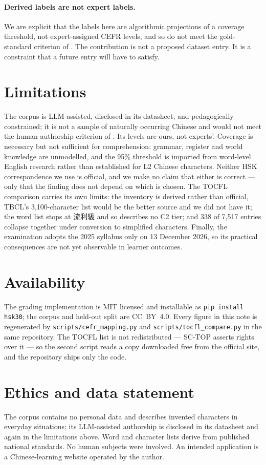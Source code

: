 \documentclass[11pt]{article}
\begin{document}
\paragraph{Derived labels are not expert labels.} We are explicit that the
labels here are algorithmic projections of a coverage threshold, not
expert-assigned CEFR levels, and so do not meet the gold-standard criterion of
\citet{imperial2025universalcefr}. The contribution is not a proposed dataset
entry. It is a constraint that a future entry will have to satisfy.

\section{Limitations}

The corpus is LLM-assisted, disclosed in its datasheet, and pedagogically
constrained; it is not a sample of naturally occurring Chinese and would not
meet the human-authorship criterion of \citet{imperial2025universalcefr}. Its
levels are ours, not experts'. Coverage is necessary but not sufficient for
comprehension: grammar, register and world knowledge are unmodelled, and the
95\% threshold is imported from word-level English research rather than
established for L2 Chinese characters. Neither HSK correspondence we use is
official, and we make no claim that either is correct --- only that the finding
does not depend on which is chosen. The TOCFL comparison carries its own
limits: the inventory is derived rather than official, TBCL's 3{,}100-character
list would be the better source and we did not have it; the word list stops at
流利級 and so describes no C2 tier; and 338 of 7{,}517 entries collapse together
under conversion to simplified characters. Finally, the examination adopts the 2025
syllabus only on 13 December 2026, so its practical consequences are not yet observable in learner
outcomes.

\section{Availability}

The grading implementation is MIT licensed and installable as
\texttt{pip install hsk30}; the corpus and held-out split are CC~BY~4.0. Every
figure in this note is regenerated by \texttt{scripts/cefr\_mapping.py} and
\texttt{scripts/tocfl\_compare.py} in the same repository. The TOCFL list is
not redistributed --- SC-TOP asserts rights over it --- so the second script
reads a copy downloaded free from the official site, and the repository ships
only the code.

\section*{Ethics and data statement}

The corpus contains no personal data and describes invented characters in
everyday situations; its LLM-assisted authorship is disclosed in its datasheet
and again in the limitations above. Word and character lists derive from
published national standards. No human subjects were involved. An intended
application is a Chinese-learning website operated by the author.


\end{document}
